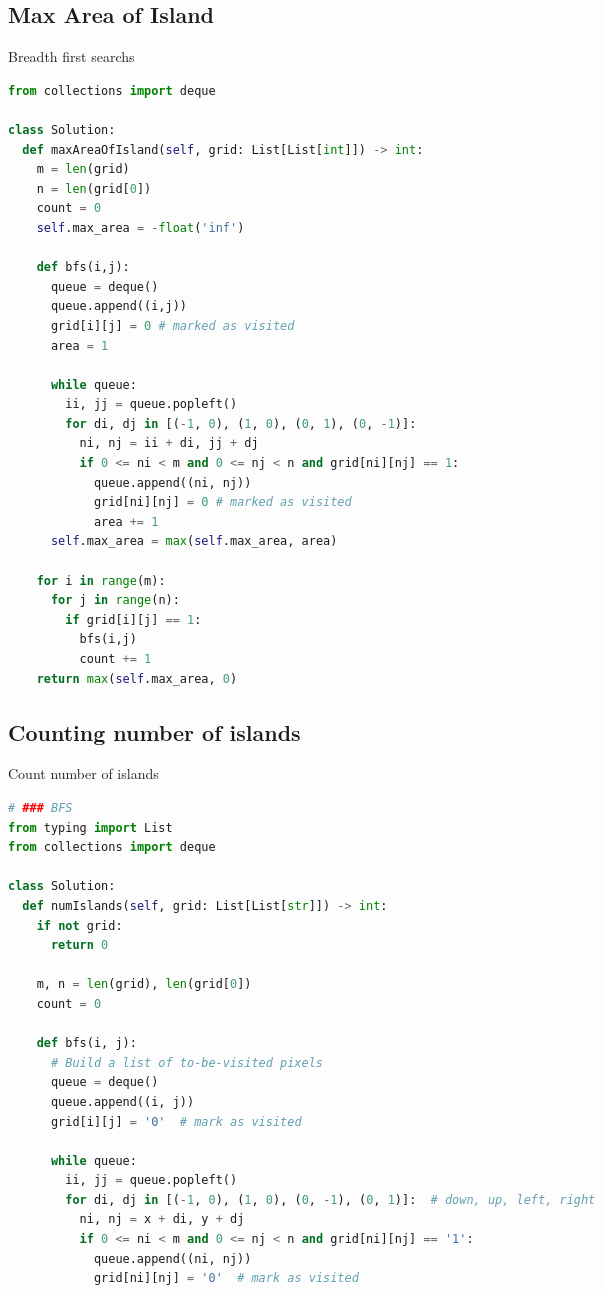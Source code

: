 \documentclass[a4paper,12pt]{article}
\begin{document}
\begin{multicols}{2}
\subsection{Max Area of Island}
\begin{mycode}[label={lst:max-area-of-island}]{Breadth first searchs}
\begin{lstlisting}[language=Python]
from collections import deque

class Solution:
  def maxAreaOfIsland(self, grid: List[List[int]]) -> int:
    m = len(grid)
    n = len(grid[0])
    count = 0
    self.max_area = -float('inf')

    def bfs(i,j):
      queue = deque()
      queue.append((i,j))
      grid[i][j] = 0 # marked as visited
      area = 1

      while queue:
        ii, jj = queue.popleft()
        for di, dj in [(-1, 0), (1, 0), (0, 1), (0, -1)]:
          ni, nj = ii + di, jj + dj
          if 0 <= ni < m and 0 <= nj < n and grid[ni][nj] == 1:
            queue.append((ni, nj))
            grid[ni][nj] = 0 # marked as visited
            area += 1
      self.max_area = max(self.max_area, area)
    
    for i in range(m):
      for j in range(n):
        if grid[i][j] == 1:
          bfs(i,j)
          count += 1
    return max(self.max_area, 0)
\end{lstlisting}
\end{mycode}


\subsection{Counting number of islands}

\begin{mycode}[label={lst:add-two-numbers}]{Count number of islands}
\begin{lstlisting}[language=Python]
# ### BFS
from typing import List
from collections import deque

class Solution:
  def numIslands(self, grid: List[List[str]]) -> int:
    if not grid:
      return 0

    m, n = len(grid), len(grid[0])
    count = 0

    def bfs(i, j):
      # Build a list of to-be-visited pixels
      queue = deque()
      queue.append((i, j))
      grid[i][j] = '0'  # mark as visited

      while queue:
        ii, jj = queue.popleft()
        for di, dj in [(-1, 0), (1, 0), (0, -1), (0, 1)]:  # down, up, left, right
          ni, nj = x + di, y + dj
          if 0 <= ni < m and 0 <= nj < n and grid[ni][nj] == '1':
            queue.append((ni, nj))
            grid[ni][nj] = '0'  # mark as visited


\end{lstlisting}
\end{mycode}
\end{multicols}
\end{document}
